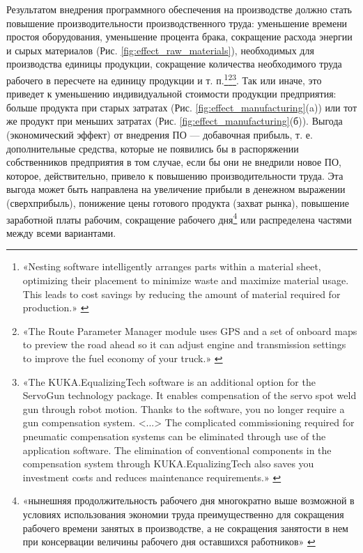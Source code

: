 \documentclass{article}
\begin{document}
Результатом внедрения программного обеспечения на производстве должно стать повышение производительности производственного труда: уменьшение времени простоя оборудования, уменьшение процента брака, сокращение расхода энергии и сырых материалов (Рис. \ref{fig:effect_raw_materials}), необходимых для производства единицы продукции, сокращение количества необходимого труда рабочего в пересчете на единицу продукции и т. п.\footnote{«Nesting software intelligently arranges parts within a material sheet, optimizing their placement to minimize waste and maximize material usage. This leads to cost savings by reducing the amount of material required for production.» \cite{autodeskNesting}}\footnote{«The Route Parameter Manager module uses GPS and a set of onboard maps to preview the road ahead so it can adjust engine and transmission settings to improve the fuel economy of your truck.» \cite{cumminsAdept}}\footnote{«The KUKA.EqualizingTech software is an additional option for the ServoGun technology package. It enables compensation of the servo spot weld gun through robot motion. Thanks to the software, you no longer require a gun compensation system. <...> The complicated commissioning required for pneumatic compensation systems can be eliminated through use of the application software. The elimination of conventional components in the compensation system through KUKA.EqualizingTech also saves you investment costs and reduces maintenance requirements.» \cite{kukaEqulizingTech}}. Так или иначе, это приведет к уменьшению индивидуальной стоимости продукции предприятия: больше продукта при старых затратах (Рис. \ref{fig:effect_manufacturing}(a)) или тот же продукт при меньших затратах (Рис. \ref{fig:effect_manufacturing}(б)). Выгода (экономический эффект) от внедрения ПО — добавочная прибыль, т. е. дополнительные средства, которые не появились бы в распоряжении собственников предприятия в том случае, если бы они не внедрили новое ПО, которое, действительно, привело к повышению производительности труда. Эта выгода может быть направлена на увеличение прибыли в денежном выражении (сверхприбыль), понижение цены готового продукта (захват рынка), повышение заработной платы рабочим, сокращение рабочего дня\footnote{«нынешняя продолжительность рабочего дня многократно выше возможной в условиях использования экономии труда преимущественно для сокращения рабочего времени занятых в производстве, а не сокращения занятости в нем при консервации величины рабочего дня оставшихся работников» \cite{workingTime2020}} или распределена частями между всеми вариантами.
\end{document}

